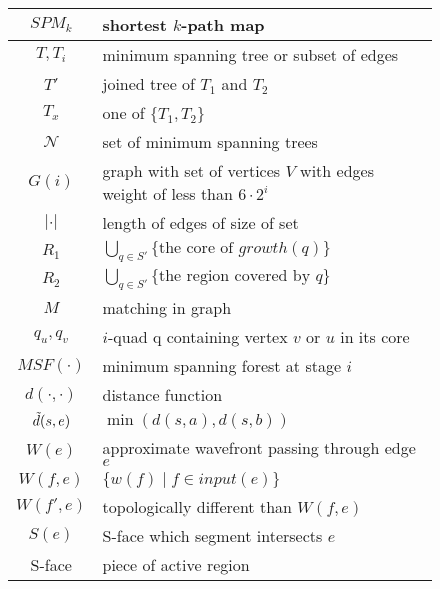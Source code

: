 \begin{figure}
\begin{center}
\begin{tabular}{| c | l |}
	\hline
	$SPM_k$ & shortest $k$-path map\\
	\hline
	$T, T_i$ & minimum spanning tree or subset of edges \\
	\hline
	$T'$ & joined tree of $T_1$ and $T_2$ \\
	\hline
	$T_x$ & one of $\{T_1, T_2\}$ \\
	\hline
	$\mathcal{N}$ & set of minimum spanning trees \\
	\hline
	$G(i)$ & graph with set of vertices $V$ with edges weight of less than $6 \cdot 2^i$ \\
	\hline
	$|\cdot|$ & length of edges of size of set \\
	\hline
	$R_1$ & $\bigcup_{q \in S'} \{\text{the core of } growth(q)\}$ \\
	\hline
	$R_2$ & $\bigcup_{q \in S'} \{\text{the region covered by } q\}$ \\
	\hline
	$M$ & matching in graph \\
	\hline
	$q_u, q_v$ & $i$-quad q containing vertex $v$ or $u$ in its core \\
	\hline
	$MSF(\cdot)$ & minimum spanning forest at stage $i$ \\
	\hline
	$d(\cdot, \cdot)$ & distance function \\
	\hline
	$\Tilde{d}(s,e)$ & $\min(d(s,a),d(s,b))$ \\
	\hline
	$W(e)$ & approximate wavefront passing through edge $e$ \\
	\hline
	$W(f,e)$ & $\{w(f) \mid f \in input(e)\}$ \\
	\hline
	$W(f',e)$ & topologically different than $W(f,e)$ \\
	\hline
	$S(e)$ & S-face which segment intersects $e$ \\
	\hline
	S-face & piece of active region
	\hline
\end{tabular}
\end{center}
\end{figure}